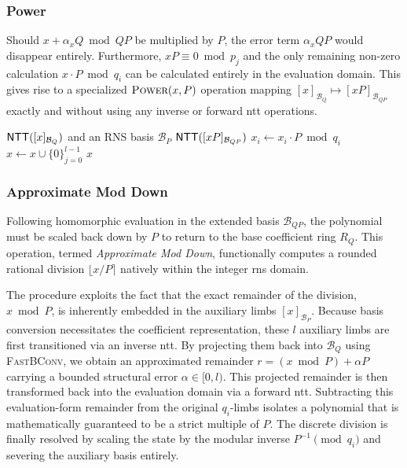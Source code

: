 \subsubsection{Power}
Should $x + \alpha_x Q \bmod{QP}$ be multiplied by $P$, the error term $\alpha_x Q P$ would disappear entirely. Furthermore, $xP \equiv 0 \bmod{p_j}$ and the only remaining non-zero calculation $x\cdot P \bmod q_i$ can be calculated entirely in the evaluation domain. This gives rise to a specialized $\Call{Power}{x, P}$ operation mapping $[x]_{\mathcal{B}_Q} \mapsto [xP]_{\mathcal{B}_{QP}}$ exactly and without using any inverse or forward \gls{ntt} operations. 

\begin{algorithm}[ht!]
\caption{\protect{}}
\label{alg:Power}
\begin{algorithmic}[1]
    \Require $\mathsf{NTT}([x]_{\mathcal{B}_Q})$ and an RNS basis $\mathcal{B}_P$
    \Ensure $\mathsf{NTT}([xP]_{\mathcal{B}_{QP}})$
        \State $x_i \gets x_i\cdot P \bmod{q_i}$
    \EndFor
    \State $x \gets x \cup \{0\}_{j=0}^{l-1}$
    \State\Return $x$
\end{algorithmic}
\end{algorithm}

\subsubsection{Approximate Mod Down}
Following homomorphic evaluation in the extended basis $\mathcal{B}_{QP}$, the polynomial must be scaled back down by $P$ to return to the base coefficient ring $R_Q$. This operation, termed \emph{Approximate Mod Down}, functionally computes a rounded rational division $\lfloor x/P \rceil$ natively within the integer \gls{rns} domain. %

The procedure exploits the fact that the exact remainder of the division, $x \bmod P$, is inherently embedded in the auxiliary limbs $[x]_{\mathcal{B}_P}$. Because basis conversion necessitates the coefficient representation, these $l$ auxiliary limbs are first transitioned via an inverse \gls{ntt}. By projecting them back into $\mathcal{B}_Q$ using \textsc{FastBConv}, we obtain an approximated remainder $r = (x \bmod P) + \alpha P$ carrying a bounded structural error $\alpha \in [0, l)$. This projected remainder is then transformed back into the evaluation domain via a forward \gls{ntt}. Subtracting this evaluation-form remainder from the original $q_i$-limbs isolates a polynomial that is mathematically guaranteed to be a strict multiple of $P$. The discrete division is finally resolved by scaling the state by the modular inverse $P^{-1} \pmod{q_i}$ and severing the auxiliary basis entirely.

